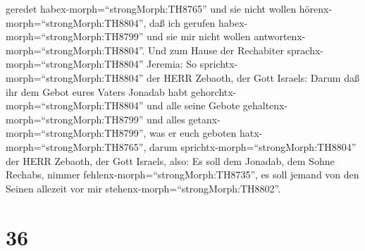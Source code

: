 geredet habex-morph=``strongMorph:TH8765'' und sie nicht wollen
hörenx-morph=``strongMorph:TH8804'', daß ich gerufen
habex-morph=``strongMorph:TH8799'' und sie mir nicht wollen
antwortenx-morph=``strongMorph:TH8804''.  Und zum Hause der
Rechabiter sprachx-morph=``strongMorph:TH8804'' Jeremia: So
sprichtx-morph=``strongMorph:TH8804'' der HERR Zebaoth, der Gott
Israels: Darum daß ihr dem Gebot eures Vaters Jonadab habt
gehorchtx-morph=``strongMorph:TH8804'' und alle seine Gebote
gehaltenx-morph=``strongMorph:TH8799'' und alles
getanx-morph=``strongMorph:TH8799'', was er euch geboten
hatx-morph=``strongMorph:TH8765'',  darum
sprichtx-morph=``strongMorph:TH8804'' der HERR Zebaoth, der Gott
Israels, also: Es soll dem Jonadab, dem Sohne Rechabs, nimmer
fehlenx-morph=``strongMorph:TH8735'', es soll jemand von den Seinen
allezeit vor mir stehenx-morph=``strongMorph:TH8802''.

\hypertarget{section-35}{%
\section{36}\label{section-35}}

